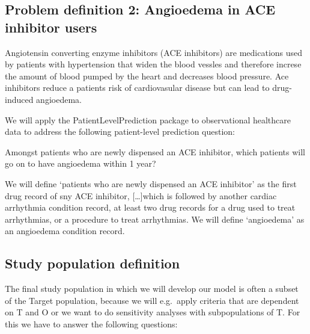 \documentclass[
]{article}
\begin{document}
\hypertarget{problem-definition-2-angioedema-in-ace-inhibitor-users}{%
\subsection{Problem definition 2: Angioedema in ACE inhibitor
users}\label{problem-definition-2-angioedema-in-ace-inhibitor-users}}

Angiotensin converting enzyme inhibitors (ACE inhibitors) are
medications used by patients with hypertension that widen the blood
vessles and therefore increse the amount of blood pumped by the heart
and decreases blood pressure. Ace inhibitors reduce a patients risk of
cardiovasular disease but can lead to drug-induced angioedema.

We will apply the PatientLevelPrediction package to observational
healthcare data to address the following patient-level prediction
question:

Amongst patients who are newly dispensed an ACE inhibitor, which
patients will go on to have angioedema within 1 year?

We will define `patients who are newly dispensed an ACE inhibitor' as
the first drug record of sny ACE inhibitor, {[}\ldots{]}which is
followed by another cardiac arrhythmia condition record, at least two
drug records for a drug used to treat arrhythmias, or a procedure to
treat arrhythmias. We will define `angioedema' as an angioedema
condition record.

\hypertarget{study-population-definition}{%
\subsection{Study population
definition}\label{study-population-definition}}

The final study population in which we will develop our model is often a
subset of the Target population, because we will e.g.~apply criteria
that are dependent on T and O or we want to do sensitivity analyses with
subpopulations of T. For this we have to answer the following questions:
\end{document}
